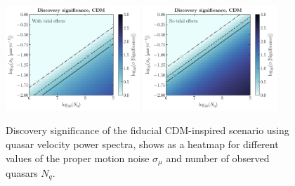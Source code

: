 \documentclass[prd,aps,10pt,nofootinbib,twocolumn,superscriptaddress,preprintnumbers,balancelastpage,longbibliography]{revtex4-1}
\begin{document}
\begin{figure}[htbp]
  \centering
  \includegraphics[width=0.45\textwidth]{plots/LCDM_disc}
  \includegraphics[width=0.45\textwidth]{plots/LCDM_disc_notidal}
  \caption{Discovery significance of the fiducial CDM-inspired scenario using quasar velocity power spectra, shows as a heatmap for different values of the proper motion noise $\sigma_\mu$ and number of observed quasars $N_q$.} \label{fig:lcdm_disc}
\end{figure}



\end{document}
